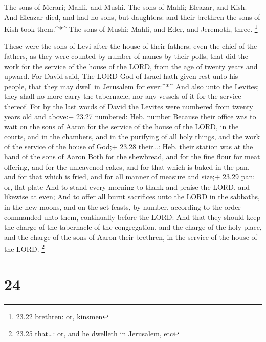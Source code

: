  The sons of Merari; Mahli, and Mushi. The sons of Mahli;
Eleazar, and Kish.  And Eleazar died, and had no sons, but
daughters: and their brethren the sons of Kish took them.\^{}*\^{}
 The sons of Mushi; Mahli, and Eder, and Jeremoth, three.
\footnote{23.22 brethren: or, kinsmen}

 These were the sons of Levi after the house of their
fathers; even the chief of the fathers, as they were counted by number
of names by their polls, that did the work for the service of the house
of the LORD, from the age of twenty years and upward.  For
David said, The LORD God of Israel hath given rest unto his people, that
they may dwell in Jerusalem for ever:\^{}*\^{}  And also
unto the Levites; they shall no more carry the tabernacle, nor any
vessels of it for the service thereof.  For by the last
words of David the Levites were numbered from twenty years old and
above:+ 23.27 numbered: Heb. number  Because their office
was to wait on the sons of Aaron for the service of the house of the
LORD, in the courts, and in the chambers, and in the purifying of all
holy things, and the work of the service of the house of God;+ 23.28
their\ldots: Heb. their station was at the hand of the sons of Aaron
 Both for the shewbread, and for the fine flour for meat
offering, and for the unleavened cakes, and for that which is baked in
the pan, and for that which is fried, and for all manner of measure and
size;+ 23.29 pan: or, flat plate  And to stand every
morning to thank and praise the LORD, and likewise at even;
 And to offer all burnt sacrifices unto the LORD in the
sabbaths, in the new moons, and on the set feasts, by number, according
to the order commanded unto them, continually before the LORD:
 And that they should keep the charge of the tabernacle of
the congregation, and the charge of the holy place, and the charge of
the sons of Aaron their brethren, in the service of the house of the
LORD. \footnote{23.25 that\ldots: or, and he dwelleth in Jerusalem, etc}

\hypertarget{section-23}{%
\section{24}\label{section-23}}

